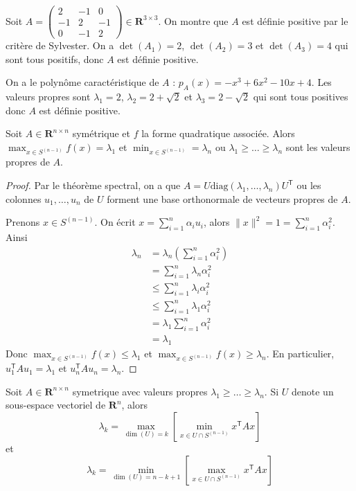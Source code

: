 \begin{example}
Soit $A=\begin{pmatrix}2 & -1 & 0 \\ -1 & 2 & -1 \\ 0 & -1 & 2\end{pmatrix}\in \mathbf{R}^{3\times  3}$. On montre que $A$ est définie positive par le critère de Sylvester. On a $\det(A_{1})=2$, $\det(A_{2})=3$ et $\det(A_{3})=4$ qui sont tous positifs, donc $A$ est définie positive.

On a le polynôme caractéristique de $A$ : $p_{A}(x)=-x^{3}+6x^{2}-10x+4$. Les valeurs propres sont $\lambda_{1}=2$, $\lambda_{2}=2+\sqrt{ 2 }$ et $\lambda_{3}=2-\sqrt{ 2 }$ qui sont tous positives donc $A$ est définie positive.
\end{example}
\begin{theorem}\label{thm619}
Soit $A\in \mathbf{R}^{n\times n}$ symétrique et $f$ la forme quadratique associée. Alors $\max_{x \in S^{(n-1)}}f(x)=\lambda_{1}$ et $\min_{x \in S^{(n-1)}}=\lambda _{n}$ ou $\lambda_{1}\ge \dots \ge\lambda _{n}$ sont les valeurs propres de $A$.
\end{theorem}
\begin{proof}
Par le théorème spectral, on a que $A=U\mathrm{diag}(\lambda_{1},\dots,\lambda _{n})U^{\mathsf{T}}$ ou les colonnes $u_{1},\dots,u_{n}$ de $U$ forment une base orthonormale de vecteurs propres de $A$. 

Prenons $x \in S^{(n-1)}$. On écrit $x=\sum _{i=1}^{n}\alpha _{i}u_{i}$, alors $\lVert x \rVert^{2}=1=\sum_{i=1}^{n}\alpha _{i}^{2}$. Ainsi 
\begin{align*}
\lambda _{n} & =\lambda _{n}\left( \sum_{i=1}^{n} \alpha _{i}^{2} \right) \\
 & =\sum_{i=1}^{n} \lambda _{n}\alpha _{i}^{2} \\
 & \le \sum_{i=1}^{n} \lambda _{i}\alpha _{i}^{2} \\
 & \le \sum_{i=1}^{n} \lambda_{1}\alpha _{i}^{2} \\
 & =\lambda _{1}\sum_{i=1}^{n} \alpha _{i}^{2} \\
 & =\lambda_{1}
\end{align*}
Donc $\max_{x \in S^{(n-1)}}f(x)\le\lambda_{1}$ et $\max_{x \in S^{(n-1)}}f(x)\ge \lambda _{n}$. En particulier, $u_{1}^{\mathsf{T}}Au_{1}=\lambda_{1}$ et $u_{n}^{\mathsf{T}}Au_{n}=\lambda _{n}$.
\end{proof}
\begin{theorem}
Soit $A\in \mathbf{R}^{n\times n}$ symetrique avec valeurs propres $\lambda_{1}\ge \dots\ge \lambda _{n}$. Si $U$ denote un sous-espace vectoriel de $\mathbf{R}^{n}$, alors
$$
\lambda _{k}=\max_{\dim(U)=k}\left[\min_{x \in U\cap S^{(n-1)}}x^{\mathsf{T}}Ax\right]
$$
et
$$
\lambda _{k}=\min_{\dim(U)=n-k+1}\left[\max_{x \in U\cap S^{(n-1)}}x^{\mathsf{T}}Ax\right]
$$
\end{theorem}